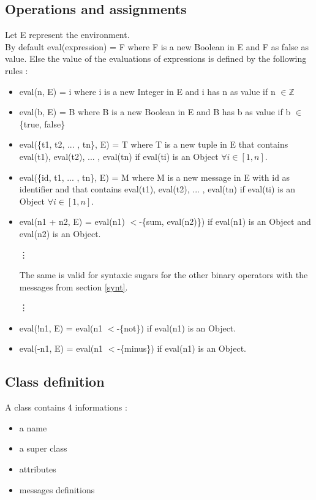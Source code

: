 \documentclass{eplDoc}
\begin{document}
\subsection{Operations and assignments}
Let E represent the environment. \\ 
By default eval(expression) = F where F is a new Boolean in E and F as false as value. Else the value of the evaluations of expressions is defined by the following rules : 
\begin{itemize}
\item eval(n, E) = i where i is a new Integer in E and i has n as value if n $\in \mathbb{Z}$ 

\item eval(b, E) = B where B is a new Boolean in E and B has b as value if b $\in$ \{true, false\} 

\item eval(\{t1, t2, ... , tn\}, E) = T where T is a new tuple in E that contains eval(t1), eval(t2), ... , eval(tn) if eval(ti) is an Object $\forall i \in [1,n]$. 

\item eval(\{id, t1, ... , tn\}, E) = M where M is a new message in E with id as identifier and that contains eval(t1), eval(t2), ... , eval(tn) if eval(ti) is an Object $\forall i \in [1,n]$. 

\item eval(n1 + n2, E) = eval(n1) $<$-\{sum, eval(n2)\}) if eval(n1) is an Object and eval(n2) is an Object. \\
\begin{center}
\vdots  \\
\end{center}
 
The same is valid for syntaxic sugars for the other binary operators with the messages from section \ref{synt}.                      
\begin{center}
\vdots \\
\end{center}
  
\item eval(!n1, E) = eval(n1 $<$-\{not\}) if eval(n1) is an Object. 
\item eval(-n1, E) = eval(n1 $<$-\{minus\}) if eval(n1) is an Object. 

\end{itemize}



\subsection{Class definition}
A class contains 4 informations : 
\begin{itemize}
    \item a name
    \item a super class
    \item attributes 
    \item messages definitions
\end{itemize}
\end{document}
